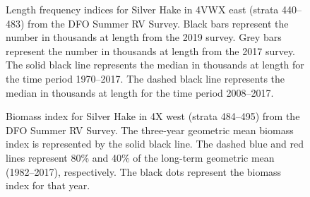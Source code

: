 \documentclass[11pt]{book}
\begin{document}
\begin{figure}[htb]

{\centering {} 

}

\caption{Length frequency indices for Silver Hake in 4VWX east (strata 440--483) from the DFO Summer RV Survey. Black bars represent the number in thousands at length from the 2019 survey. Grey bars represent the number in thousands at length from the 2017 survey. The solid black line represents the median in thousands at length for the time period 1970--2017. The dashed black line represents the median in thousands at length for the time period 2008--2017.}\label{fig:28-fig-silverhake-lengthfreq4VX}
\end{figure}

\begin{figure}[htb]

{\centering {} 

}

\caption{Biomass index for Silver Hake in 4X west (strata 484--495) from the DFO Summer RV Survey. The three-year geometric mean biomass index is represented by the solid black line. The dashed blue and red lines represent 80\% and 40\% of the long-term geometric mean (1982--2017), respectively. The black dots represent the biomass index for that year.}\label{fig:29-fig-silverhake-biomass4X}
\end{figure}
\end{document}
